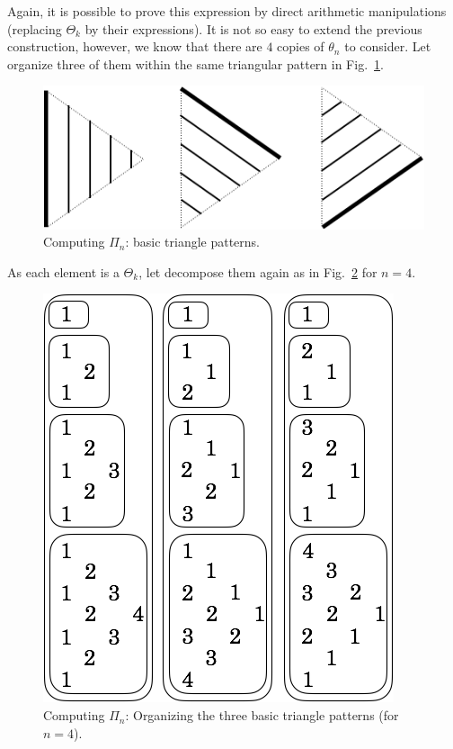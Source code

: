 Again, it is possible to prove this expression by direct arithmetic manipulations
(replacing $\Theta_k$ by their expressions). 
It is not so easy to extend the previous construction, however, we know that there are $4$ copies of $\theta_n$ to consider.
Let organize three of them within the same triangular pattern in Fig.~\ref{fig:Tetrahedral6}.
\begin{figure}[h]
\begin{center}
        \includegraphics[scale=0.35]{FiguresArithmetic/appTetrahedral6}
        \caption{Computing $\Pi_n$: basic triangle patterns.}
        \label{fig:Tetrahedral6}
\end{center}
\end{figure}
As each element is a $\Theta_k$, let decompose them again as in Fig.~\ref{fig:Tetrahedral7} for $n=4$.
\begin{figure}[h]
\begin{center}
        \includegraphics[scale=0.36]{FiguresArithmetic/appTetrahedral7}
        \caption{Computing $\Pi_n$: Organizing the three basic triangle patterns (for $n=4$).}
        \label{fig:Tetrahedral7}
\end{center}
\end{figure}
